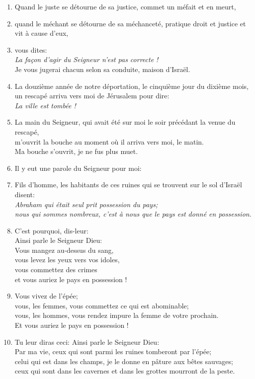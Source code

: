 \documentclass[12pt,a4paper,titlepage]{article}
\def \pslabelsep{0.2em} %
\def \psleftmargin{0em} %
\begin{document}
\begin{enumerate}[leftmargin=\psleftmargin, labelsep = \pslabelsep, label={\arabic*}, font=\color{\pscolor}\small\textsuperscript, parsep=0em, itemsep=0em, topsep=0em ]
\item Quand le juste se détourne de sa justice, commet un méfait et en meurt,
\item quand le méchant se détourne de sa méchanceté, pratique droit et justice et vit à cause d’eux,
\item vous dites: \\ \og{}\emph{La façon d’agir du Seigneur n’est pas correcte !}\fg{} \\ Je vous jugerai chacun selon sa conduite, maison d’Israël. \parSpace

\item La douzième année de notre déportation, le cinquième jour du dixième mois,\\ un rescapé arriva vers moi de Jérusalem pour dire:  \\ \og{}\emph{La ville est tombée !}\fg{}
\item La main du Seigneur, qui avait été sur moi le soir précédant la venue du rescapé, \\ m’ouvrit la bouche au moment où il arriva vers moi, le matin. \\ Ma bouche s’ouvrit, je ne fus plus muet. \verseSpace
\item Il y eut une parole du Seigneur pour moi:
\item Fils d’homme, les habitants de ces ruines qui se trouvent sur le sol d’Israël disent: \\ \og{}\emph{Abraham qui était seul prit possession du pays; \\ nous qui sommes nombreux, c’est à nous que le pays est donné en possession}.\fg{} \verseSpace
\item C’est pourquoi, dis-leur: \\ Ainsi parle le Seigneur Dieu: \\ Vous mangez au-dessus du sang, \\ vous levez les yeux vers vos idoles, \\ vous commettez des crimes \\ et vous auriez le pays en possession ! 
\item Vous vivez de l’épée; \\ vous, les femmes, vous commettez ce qui est abominable; \\ vous, les hommes, vous rendez impure la femme de votre prochain. \\ Et vous auriez le pays en possession ! \verseSpace
\item Tu leur diras ceci: Ainsi parle le Seigneur Dieu: \\ Par ma vie, ceux qui sont parmi les ruines tomberont par l’épée; \\ celui qui est dans les champs, je le donne en pâture aux bêtes sauvages; \\ ceux qui sont dans les cavernes et dans les grottes mourront de la peste.

\end{enumerate}
\end{document}
